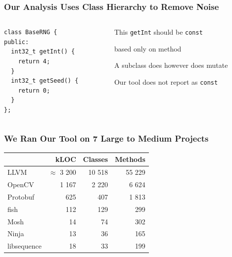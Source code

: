 \documentclass[aspectratio=169]{beamer}
\begin{document}
  \begin{frame}[fragile]
    \frametitle{Our Analysis Uses Class Hierarchy to Remove Noise}
    \begin{columns}
      \begin{column}{0.4\textwidth}
        \begin{lstlisting}
class BaseRNG {
public:
  int32_t getInt() {
    return 4;
  }
  int32_t getSeed() {
    return 0;
  }
};
        \end{lstlisting}
      \end{column}
      \begin{column}{0.5\textwidth}
        This \texttt{getInt} should be \texttt{const}

        \hspace{1em} based only on method

        \vspace{2em}

        A subclass does however does mutate

        \hspace{1em} Our tool does not report as \texttt{const}
      \end{column}
    \end{columns}
  \end{frame}

  \begin{frame}
    \frametitle{We Ran Our Tool on 7 Large to Medium Projects}

    \begin{center}\begin{tabular}{l r r r}
                  & kLOC            & Classes & Methods \\
      \hline
      LLVM        & $\approx$ 3 200 &  10 518 &  55 229 \\
      OpenCV      &           1 167 &   2 220 &   6 624 \\
      Protobuf    &             625 &     407 &   1 813 \\
      fish        &             112 &     129 &     299 \\
      Mosh        &              14 &      74 &     302 \\
      Ninja       &              13 &      36 &     165 \\
      libsequence &              18 &      33 &     199 \\
    \end{tabular}\end{center}
  \end{frame}
\end{document}
